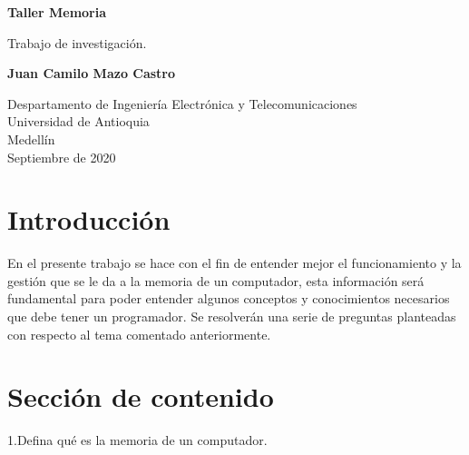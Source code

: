 \documentclass{article}
\begin{document}
\begin{titlepage}
    \begin{center}
        \vspace*{1cm}
            
        \Huge
        \textbf{Taller Memoria}
            
        \vspace{0.5cm}
        \LARGE
        Trabajo de investigación.
            
        \vspace{1.5cm}
            
        \textbf{Juan Camilo Mazo Castro}
            
        \vfill
            
        \vspace{0.8cm}
            
        \Large
        Despartamento de Ingeniería Electrónica y Telecomunicaciones\\
        Universidad de Antioquia\\
        Medellín\\
        Septiembre de 2020
            
    \end{center}
\end{titlepage}

\tableofcontents

\section{Introducción}
En el presente trabajo se hace con el fin de entender mejor el funcionamiento y la gestión que se le da a la memoria de un computador, esta información será fundamental para poder entender algunos conceptos y conocimientos necesarios que debe tener un programador. Se resolverán una serie de preguntas planteadas con respecto al tema comentado anteriormente.

\section{Sección de contenido} \label{contenido}

1.Defina qué es la memoria de un computador.
\end{document}
